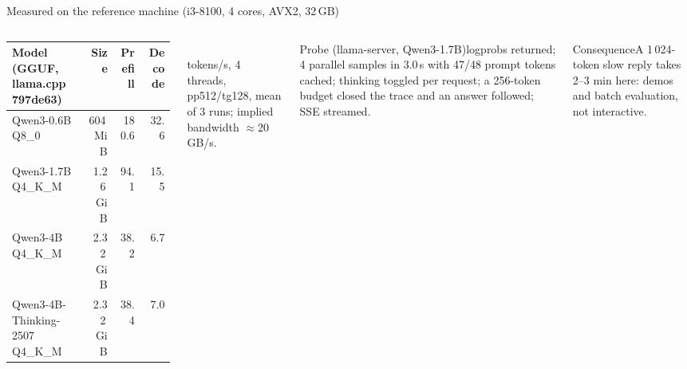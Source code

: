 \documentclass[aspectratio=169,10pt]{beamer}
\begin{document}
\begin{frame}{Measured on the reference machine (i3-8100, 4 cores, AVX2, 32\,GB)}
\begin{columns}[T]
\scriptsize
\begin{tabular}{@{}p{3.9cm}rrr@{}}
\toprule Model (GGUF, llama.cpp 797de63) & Size & Prefill & Decode\\\midrule
Qwen3-0.6B Q8\_0 & 604\,MiB & 180.6 & 32.6\\
Qwen3-1.7B Q4\_K\_M & 1.26\,GiB & 94.1 & 15.5\\
Qwen3-4B Q4\_K\_M & 2.32\,GiB & 38.2 & 6.7\\
Qwen3-4B-Thinking-2507 Q4\_K\_M & 2.32\,GiB & 38.4 & 7.0\\
\bottomrule
\end{tabular}
\\[2pt]\scriptsize tokens/s, 4 threads, pp512/tg128, mean of 3 runs; implied bandwidth $\approx$20\,GB/s.
\scriptsize
\begin{exampleblock}{Probe (llama-server, Qwen3-1.7B)}logprobs returned; 4 parallel samples in 3.0\,s with 47/48 prompt tokens cached; thinking toggled per request; a 256-token budget closed the trace and an answer followed; SSE streamed.\end{exampleblock}
\begin{alertblock}{Consequence}A 1\,024-token slow reply takes 2--3 min here: demos and batch evaluation, not interactive.\end{alertblock}
\end{columns}
\end{frame}
\end{document}
